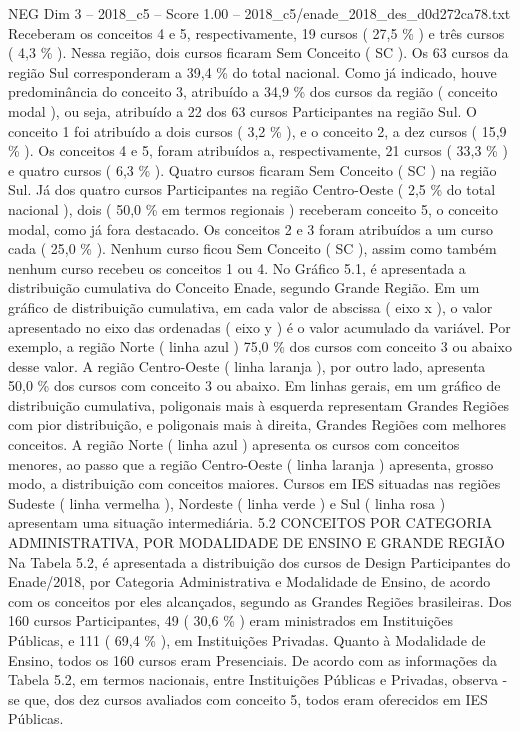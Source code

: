 \begin{textsample}{NEG Dim 3 – 2018\_c5 – Score 1.00 – 2018\_c5/enade\_2018\_des\_d0d272ca78.txt}
Receberam os conceitos 4 e 5, respectivamente, 19 cursos ( 27,5 \% ) e três cursos ( 4,3 \% ).
Nessa região, dois cursos ficaram Sem Conceito ( SC ).
Os 63 cursos da região Sul corresponderam a 39,4 \% do total nacional.
Como já indicado, houve predominância do conceito 3, atribuído a 34,9 \% dos cursos da região ( conceito modal ), ou seja, atribuído a 22 dos 63 cursos Participantes na região Sul.
O conceito 1 foi atribuído a dois cursos ( 3,2 \% ), e o conceito 2, a dez cursos ( 15,9 \% ).
Os conceitos 4 e 5, foram atribuídos a, respectivamente, 21 cursos ( 33,3 \% ) e quatro cursos ( 6,3 \% ).
Quatro cursos ficaram Sem Conceito ( SC ) na região Sul.
Já dos quatro cursos Participantes na região Centro-Oeste ( 2,5 \% do total nacional ), dois ( 50,0 \% em termos regionais ) receberam conceito 5, o conceito modal, como já fora destacado.
Os conceitos 2 e 3 foram atribuídos a um curso cada ( 25,0 \% ).
Nenhum curso ficou Sem Conceito ( SC ), assim como também nenhum curso recebeu os conceitos 1 ou 4.
No Gráfico 5.1, é apresentada a distribuição cumulativa do Conceito Enade, segundo Grande Região.
Em um gráfico de distribuição cumulativa, em cada valor de abscissa ( eixo x ), o valor apresentado no eixo das ordenadas ( eixo y ) é o valor acumulado da variável.
Por exemplo, a região Norte ( linha azul ) 75,0 \% dos cursos com conceito 3 ou abaixo desse valor.
A região Centro-Oeste ( linha laranja ), por outro lado, apresenta 50,0 \% dos cursos com conceito 3 ou abaixo.
Em linhas gerais, em um gráfico de distribuição cumulativa, poligonais mais à esquerda representam Grandes Regiões com pior distribuição, e poligonais mais à direita, Grandes Regiões com melhores conceitos.
A região Norte ( linha azul ) apresenta os cursos com conceitos menores, ao passo que a região Centro-Oeste ( linha laranja ) apresenta, grosso modo, a distribuição com conceitos maiores.
Cursos em IES situadas nas regiões Sudeste ( linha vermelha ), Nordeste ( linha verde ) e Sul ( linha rosa ) apresentam uma situação intermediária. 5.2 CONCEITOS POR CATEGORIA ADMINISTRATIVA, POR MODALIDADE DE ENSINO E GRANDE REGIÃO Na Tabela 5.2, é apresentada a distribuição dos cursos de Design Participantes do Enade/2018, por Categoria Administrativa e Modalidade de Ensino, de acordo com os conceitos por eles alcançados, segundo as Grandes Regiões brasileiras.
Dos 160 cursos Participantes, 49 ( 30,6 \% ) eram ministrados em Instituições Públicas, e 111 ( 69,4 \% ), em Instituições Privadas.
Quanto à Modalidade de Ensino, todos os 160 cursos eram Presenciais.
De acordo com as informações da Tabela 5.2, em termos nacionais, entre Instituições Públicas e Privadas, observa -se que, dos dez cursos avaliados com conceito 5, todos eram oferecidos em IES Públicas.

\end{textsample}
